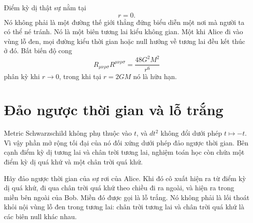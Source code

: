 Điểm kỳ dị thật sự nằm tại
\begin{equation}
r=0.
\end{equation}
Nó không phải là một đường thế giới thẳng đứng biểu diễn một nơi mà người ta có thể né tránh. Nó là một biên tương lai kiểu không gian. Một khi Alice đi vào vùng lỗ đen, mọi đường kiểu thời gian hoặc null hướng về tương lai đều kết thúc ở đó. Bất biến độ cong
\begin{equation}
R_{\mu\nu\rho\sigma}R^{\mu\nu\rho\sigma}
=\frac{48G^2M^2}{r^6}
\label{eq:l04-kretschmann}
\end{equation}
phân kỳ khi \(r\to0\), trong khi tại \(r=2GM\) nó là hữu hạn.

\section{Đảo ngược thời gian và lỗ trắng}

Metric Schwarzschild không phụ thuộc vào \(t\), và \(dt^2\) không đổi dưới phép \(t\mapsto-t\). Vì vậy phần mở rộng tối đại của nó đối xứng dưới phép đảo ngược thời gian. Bên cạnh điểm kỳ dị tương lai và chân trời tương lai, nghiệm toán học còn chứa một điểm kỳ dị quá khứ và một chân trời quá khứ.

Hãy đảo ngược thời gian của sự rơi của Alice. Khi đó cô xuất hiện ra từ điểm kỳ dị quá khứ, đi qua chân trời quá khứ theo chiều đi ra ngoài, và hiện ra trong miền bên ngoài của Bob. Miền đó được gọi là lỗ trắng. Nó không phải là lối thoát khỏi nội vùng lỗ đen trong tương lai: chân trời tương lai và chân trời quá khứ là các biên null khác nhau.

\begin{classroomqa}
\end{classroomqa}

\begin{classroomqa}
\end{classroomqa}


